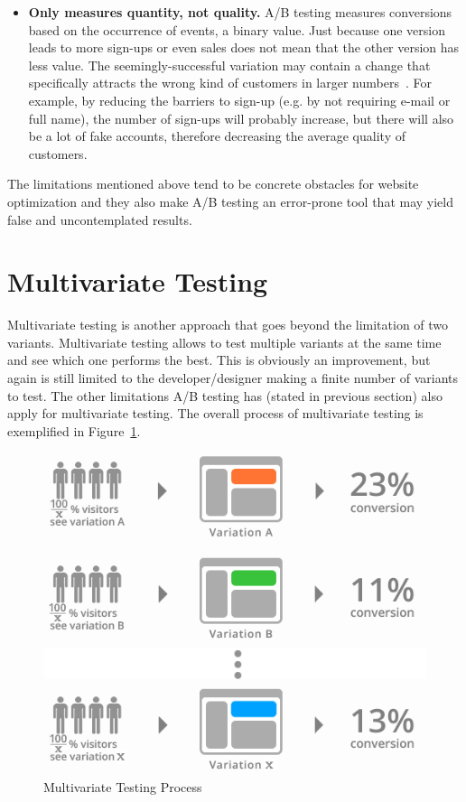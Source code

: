 \documentclass{report}
\begin{document}
\begin{itemize}
	\item \textbf{Only measures quantity, not quality.} A/B testing measures conversions based on the occurrence of events, a binary value. Just because one version leads to more sign-ups or even sales does not mean that the other version has less value. The seemingly-successful variation may contain a change that specifically attracts the wrong kind of customers in larger numbers~\cite{abtestbad}. For example, by reducing the barriers to sign-up (e.g. by not requiring e-mail or full name), the number of sign-ups will probably increase, but there will also be a lot of fake accounts, therefore decreasing the average quality of customers.
\end{itemize}

The limitations mentioned above tend to be concrete obstacles for website optimization and they also make A/B testing an error-prone tool that may yield false and uncontemplated results.

\section{Multivariate Testing}
Multivariate testing is another approach that goes beyond the limitation of two variants. Multivariate testing allows to test multiple variants at the same time and see which one performs the best. This is obviously an improvement, but again is still limited to the developer/designer making a finite number of variants to test. The other limitations A/B testing has (stated in previous section) also apply for multivariate testing. The overall process of multivariate testing is exemplified in Figure~\ref{fig:mvtesting}.\\ 

\begin{figure}[ht]
	\centering
	\includegraphics[width=\linewidth]{imgs/mv_testing.png}
	\caption{Multivariate Testing Process}
	\label{fig:mvtesting}
\end{figure}
\end{document}
